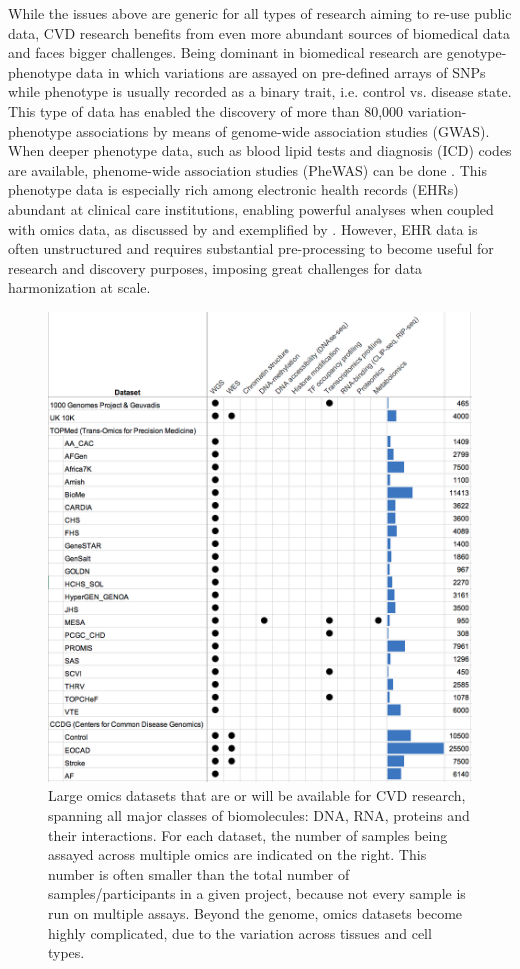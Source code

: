 \documentclass[letter]{bioinfo}
\begin{document}
    While the issues above are generic for all types of research aiming to re-use public data, CVD research benefits from even more abundant sources of biomedical data and faces bigger challenges. Being dominant in biomedical research are genotype-phenotype data in which variations are assayed on pre-defined arrays of SNPs while phenotype is usually recorded as a binary trait, i.e. control vs. disease state. This type of data has enabled the discovery of more than 80,000 variation-phenotype associations by means of genome-wide association studies (GWAS). When deeper phenotype data, such as blood lipid tests and diagnosis (ICD) codes are available, phenome-wide association studies (PheWAS) can be done \citep{Denny:2013:Systematic}. This phenotype data is especially rich among electronic health records (EHRs) abundant at clinical care institutions, enabling powerful analyses when coupled with omics data, as discussed by \cite{Denaxas:2015:Big, Wu:2017:Omic} and exemplified by \cite{Dewey:2016:Distribution,Li:2018:Decoding}. However, EHR data is often unstructured and requires substantial pre-processing to become useful for research and discovery purposes, imposing great challenges for data harmonization at scale.
    
    	\begin{figure}[!tpb]
	\includegraphics[width=1\linewidth]{trans-omics-data-sets.png}
		\caption{Large omics datasets that are or will be available for CVD research, spanning all major classes of biomolecules: DNA, RNA, proteins and their interactions. For each dataset, the number of samples being assayed across multiple omics are indicated on the right. This number is often smaller than the total number of samples/participants in a given project, because not every sample is run on multiple assays. Beyond the genome, omics datasets become highly complicated, due to the variation across tissues and cell types.}
		\label{fig:trans-omics}
	\end{figure} 
	
\end{document}
